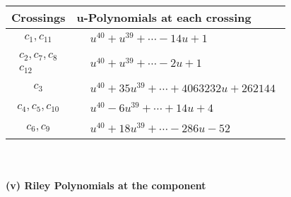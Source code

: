 \documentclass[1p]{elsarticle_modified}
\theoremstyle{definition}
\begin{document}
\begin{tabular}{m{50pt}|m{274pt}}
Crossings & \hspace{64pt}u-Polynomials at each crossing \\
\hline $$\begin{aligned}c_{1},c_{11}\end{aligned}$$&$\begin{aligned}
&u^{40}+u^{39}+\cdots-14 u+1
\end{aligned}$\\
\hline $$\begin{aligned}c_{2},c_{7},c_{8}\\c_{12}\end{aligned}$$&$\begin{aligned}
&u^{40}+u^{39}+\cdots-2 u+1
\end{aligned}$\\
\hline $$\begin{aligned}c_{3}\end{aligned}$$&$\begin{aligned}
&u^{40}+35 u^{39}+\cdots+4063232 u+262144
\end{aligned}$\\
\hline $$\begin{aligned}c_{4},c_{5},c_{10}\end{aligned}$$&$\begin{aligned}
&u^{40}-6 u^{39}+\cdots+14 u+4
\end{aligned}$\\
\hline $$\begin{aligned}c_{6},c_{9}\end{aligned}$$&$\begin{aligned}
&u^{40}+18 u^{39}+\cdots-286 u-52
\end{aligned}$\\
\hline
\end{tabular}\\~\\
\newpage\renewcommand{\arraystretch}{1}
\flushleft \textbf{(v) Riley Polynomials at the component}\newline \\
\end{document}
